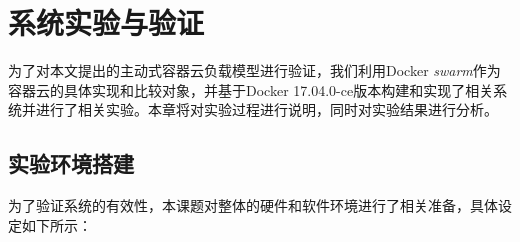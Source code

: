 
\chapter{系统实验与验证}\label{chap:sys_eval}
为了对本文提出的主动式容器云负载模型进行验证，我们利用Docker \emph{swarm}作为容器云的具体实现和比较对象，并基于Docker 17.04.0-ce版本构建和实现了相关系统并进行了相关实验。本章将对实验过程进行说明，同时对实验结果进行分析。

\section{实验环境搭建}\label{sec:env_prep}
为了验证系统的有效性，本课题对整体的硬件和软件环境进行了相关准备，具体设定如下所示：
